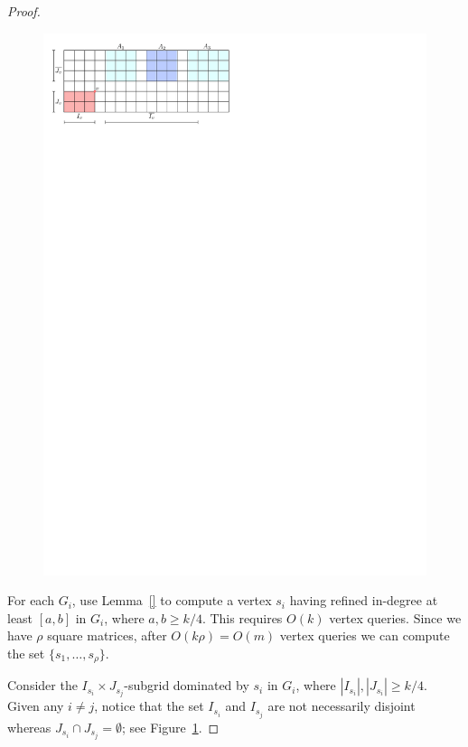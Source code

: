 \documentclass[a4paper,10pt]{article}
\newcommand{\indegree}{refined in-degree\xspace}
\begin{document}
\begin{proof}
\begin{figure}[tb]
\centering
\includegraphics{expansion_lemma_fig1.pdf}
\caption{\small }
\label{fig:Expansion Lemma 1}
\end{figure}

For each $G_i$, use Lemma~\ref{} to compute a vertex $s_i$ having \indegree at least $[a,b]$ in $G_i$, where $a,b \geq k/4$.
This requires $O(k)$ vertex queries. Since we have $\rho$ square matrices, after $O(k\rho) = O(m)$ vertex queries we can compute the set $\{s_1, \ldots, s_\rho\}$.
 
Consider the $I_{s_i}\times J_{s_j}$-subgrid dominated by $s_i$ in $G_i$, where $|I_{s_i}|, |J_{s_i}| \geq k/4$. Given any $i\neq j$, notice that the set $I_{s_i}$ and $I_{s_j}$ are not necessarily disjoint whereas $J_{s_i}\cap J_{s_j} = \emptyset$; see Figure~\ref{fig:Expansion Lemma 1}.


\end{proof}
\end{document}
